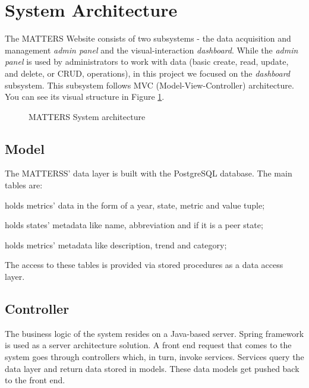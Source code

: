 	\section{System Architecture}
	
		The MATTERS Website consists of two subsystems - the data acquisition and management \emph{admin panel} and the visual-interaction \emph{dashboard}.
		While the \emph{admin panel} is used by administrators to work with data 
		(basic create, read, update, and delete, or CRUD, operations), in this project we focused on the \emph{dashboard} subsystem.
		This subsystem follows MVC (Model-View-Controller) architecture. You can see its visual 
		structure in Figure \ref{fig:sysarch}.
		
		\begin{figure}[t]
			\centering
			
			\caption{MATTERS System architecture}
			\label{fig:sysarch}
		\end{figure}
		
		
		\subsection{Model}
			
			The MATTERSS' data layer is built with the PostgreSQL database. The main tables are:
			
			\begin{description}[itemsep=-1.5mm, align=right,labelwidth=3cm]
				\item [Statistics]
					holds metrics' data in the form of a year, state, metric and value tuple;
				\item [States]
					holds states' metadata like name, abbreviation and if it is a peer state;
				\item [Metrics]
					holds metrics' metadata like description, trend and category;							
			\end{description}
			
			The access to these tables is provided via stored procedures as a data access layer.
			
		\subsection{Controller}
		
			The business logic of the system resides on a Java-based server. Spring framework is 
			used as a server architecture solution. A front end request that comes to the system goes 
			through controllers which, in turn, invoke services. Services query the data layer and return 
			data stored	in models. These data models get pushed back to the front end.
			
